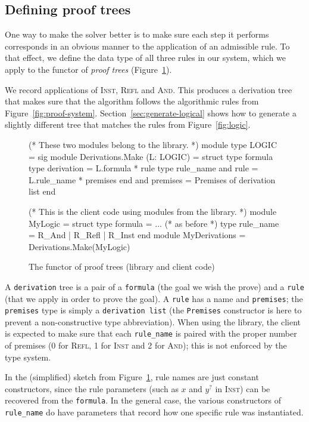 \documentclass{easychair}
\def\li{\lstinline}
\let\Rule\textsc
\newcommand{\fref}[1]{Figure~\ref{fig:#1}}
\newcommand{\sref}[1]{Section~\ref{sec:#1}}
\newcommand{\f}[1]{\ensuremath{#1^?}} %
\begin{document}
\subsection{Defining proof trees}

One way to make the solver better is to make sure each step it performs
corresponds in an obvious manner to the application of an admissible rule. To
that effect, we define the data type of all three rules in our system, which we
apply to the functor of \emph{proof trees} (\fref{proof-trees}).

We record applications of \Rule{Inst}, \Rule{Refl} and \Rule{And}. This produces
a derivation tree that makes sure that the algorithm follows the algorithmic
rules from \fref{proof-system}. \sref{generate-logical} shows how to generate a
slightly different tree that matches the rules from \fref{logic}.

\begin{figure}
  \centering
\begin{ocaml}
(* These two modules belong to the library. *)
module type LOGIC = sig     module Derivations.Make (L: LOGIC) = struct
  type formula                type derivation = L.formula * rule
  type rule_name              and rule = L.rule_name * premises
end                           and premises = Premises of derivation list
                            end

(* This is the client code using modules from the library. *)
module MyLogic = struct
  type formula = ... (* as before *)
  type rule_name = R_And | R_Refl | R_Inst
end
module MyDerivations = Derivations.Make(MyLogic)
\end{ocaml}
  \caption{The functor of proof trees (library and client code)}
  \label{fig:proof-trees}
\end{figure}

A \li+derivation+ tree is a pair of a \li+formula+ (the goal we wish the prove)
and a \li+rule+ (that we apply in order to prove the goal). A \li+rule+ has a name
and \li+premises+; the \li+premises+ type is simply a \li+derivation list+ (the
\li+Premises+ constructor is here to prevent a non-constructive type
abbreviation). When using the library, the client is expected to make sure
that each \li+rule_name+ is paired with the proper
number of premises (0 for \Rule{Refl}, 1 for
\Rule{Inst} and 2 for \Rule{And}); this is not enforced by the type system.

In the (simplified) sketch from \fref{proof-trees}, rule names are just constant
constructors, since the rule parameters (such as $x$ and $\f y$ in \Rule{Inst})
can be recovered from the \li+formula+. In the general case, the various
constructors of \li+rule_name+ do have parameters that record how one specific
rule was instantiated.
\end{document}
